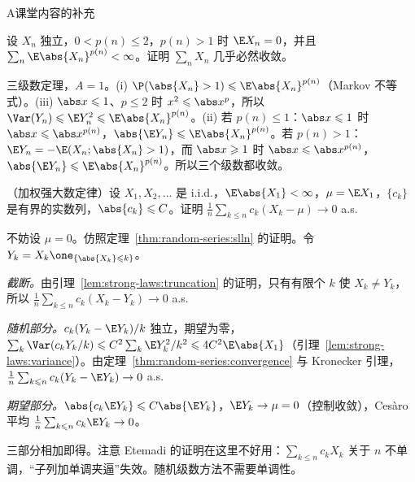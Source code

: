 \begin{exercises}{A}{课堂内容的补充}
\item\label{ex:random-series:A6} 设 $X_n$ 独立，$0<p(n)\leqslant2$，$p(n)>1$ 时 $\E X_n=0$，并且 $\sum_n\E\abs{X_n}^{p(n)}<\infty$。证明 $\sum_nX_n$ 几乎必然收敛。
\begin{solution}
三级数定理，$A=1$。(i) $\P(\abs{X_n}>1)\leqslant \E\abs{X_n}^{p(n)}$（Markov 不等式）。(iii) $\abs x\leqslant1$、$p\leqslant2$ 时 $x^2\leqslant\abs x^p$，所以 $\Var(Y_n)\leqslant \E Y_n^2\leqslant \E\abs{X_n}^{p(n)}$。(ii) 若 $p(n)\leqslant1$：$\abs x\leqslant1$ 时 $\abs x\leqslant\abs x^{p(n)}$，$\abs{\E Y_n}\leqslant \E\abs{X_n}^{p(n)}$。若 $p(n)>1$：$\E Y_n=-\E(X_n;\abs{X_n}>1)$，而 $\abs x\geqslant1$ 时 $\abs x\leqslant\abs x^{p(n)}$，$\abs{\E Y_n}\leqslant \E\abs{X_n}^{p(n)}$。所以三个级数都收敛。
\end{solution}

\item\label{ex:random-series:A7} （加权强大数定律）设 $X_1,X_2,\dots$ 是 i.i.d.，$\E\abs{X_1}<\infty$，$\mu=\E X_1$，$\{c_k\}$ 是有界的实数列，$\abs{c_k}\leqslant C$。证明 $\frac1n\sum_{k\leqslant n}c_k(X_k-\mu)\to0$ a.s.
\begin{solution}
不妨设 $\mu=0$。仿照定理~\ref{thm:random-series:slln} 的证明。令 $Y_k=X_k\one_{\{\abs{X_k}\leqslant k\}}$。

\emph{截断。}由引理~\ref{lem:strong-laws:truncation} 的证明，只有有限个 $k$ 使 $X_k\neq Y_k$，所以 $\frac1n\sum_{k\leqslant n}c_k(X_k-Y_k)\to0$ a.s.

\emph{随机部分。}$c_k(Y_k-\E Y_k)/k$ 独立，期望为零，$\sum_k\Var(c_kY_k/k)\leqslant C^2\sum_k\E Y_k^2/k^2\leqslant4C^2\E\abs{X_1}$（引理~\ref{lem:strong-laws:variance}）。由定理~\ref{thm:random-series:convergence} 与 Kronecker 引理，$\frac1n\sum_{k\leqslant n}c_k(Y_k-\E Y_k)\to0$ a.s.

\emph{期望部分。}$\abs{c_k\E Y_k}\leqslant C\abs{\E Y_k}$，$\E Y_k\to\mu=0$（控制收敛），Cesàro 平均 $\frac1n\sum_{k\leqslant n}c_k\E Y_k\to0$。

三部分相加即得。注意 Etemadi 的证明在这里不好用：$\sum_{k\leqslant n}c_kX_k$ 关于 $n$ 不单调，“子列加单调夹逼”失效。随机级数方法不需要单调性。
\end{solution}
\end{exercises}


